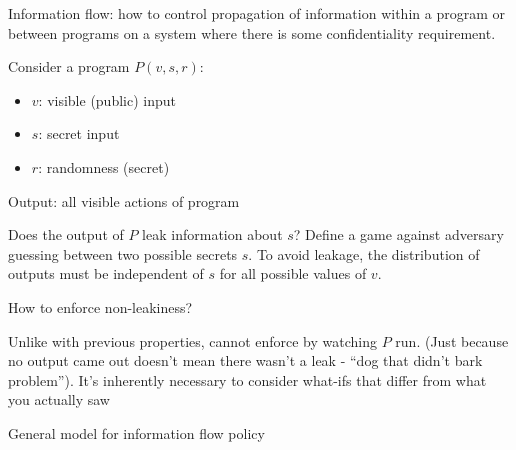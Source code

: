 Information flow: how to control propagation of information within a program or
between programs on a system where there is some confidentiality requirement.

Consider a program $P(v, s, r)$:
\begin{itemize}
    \item $v$: visible (public) input
    \item $s$: secret input
    \item $r$: randomness (secret)
\end{itemize}
Output: all visible actions of program

Does the output of $P$ leak information about $s$? Define a game against
adversary guessing between two possible secrets $s$. To avoid leakage, the
distribution of outputs must be independent of $s$ for all possible values of
$v$.

How to enforce non-leakiness?

Unlike with previous properties, cannot enforce by watching $P$ run.
(Just because no output came out doesn't mean there wasn't a leak - ``dog that
didn't bark problem''). It's inherently necessary to consider what-ifs that
differ from what you actually saw

General model for information flow policy

